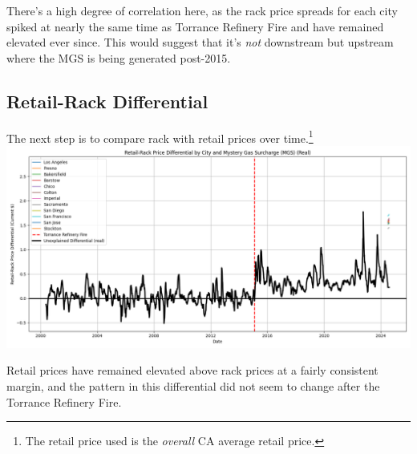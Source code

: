 \documentclass{article}
\begin{document}
\raggedright There's a high degree of correlation here, as the rack price spreads for each city spiked at nearly the same time as Torrance Refinery Fire and have remained elevated ever since. This would suggest that it's \textit{not} downstream but upstream where the MGS is being generated post-2015. 

\subsection{Retail-Rack Differential}
The next step is to compare rack with retail prices over time.\footnote{The retail price used is the \textit{overall} CA average retail price.} \\
\centering \includegraphics[width=5.5in]{retail_rack_differentials.png} \\
\raggedright Retail prices have remained elevated above rack prices at a fairly consistent margin, and the pattern in this differential did not seem to change after the Torrance Refinery Fire.
\end{document}
